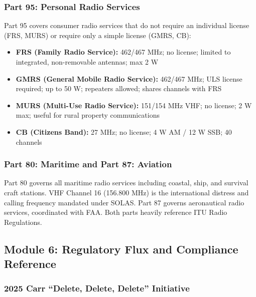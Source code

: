 \documentclass[11pt,letterpaper]{article}
\begin{document}
\subsubsection{Part 95: Personal Radio Services}

Part 95 covers consumer radio services that do not require an individual license (FRS, MURS) or require only a simple license (GMRS, CB):
\begin{itemize}[leftmargin=1.5em]
  \item \textbf{FRS (Family Radio Service):} 462/467 MHz; no license; limited to integrated, non-removable antennas; max 2 W
  \item \textbf{GMRS (General Mobile Radio Service):} 462/467 MHz; ULS license required; up to 50 W; repeaters allowed; shares channels with FRS
  \item \textbf{MURS (Multi-Use Radio Service):} 151/154 MHz VHF; no license; 2 W max; useful for rural property communications
  \item \textbf{CB (Citizens Band):} 27 MHz; no license; 4 W AM / 12 W SSB; 40 channels
\end{itemize}

\subsubsection{Part 80: Maritime and Part 87: Aviation}

Part 80 governs all maritime radio services including coastal, ship, and survival craft stations. VHF Channel 16 (156.800 MHz) is the international distress and calling frequency mandated under SOLAS. Part 87 governs aeronautical radio services, coordinated with FAA. Both parts heavily reference ITU Radio Regulations.

\subsection{Module 6: Regulatory Flux and Compliance Reference}

\subsubsection{2025 Carr ``Delete, Delete, Delete'' Initiative}
\end{document}
